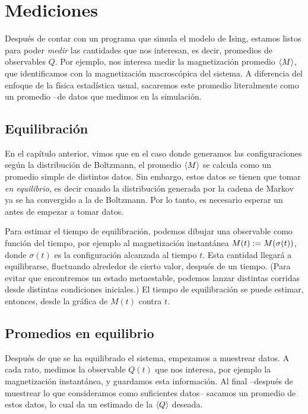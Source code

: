 \chapter{Mediciones}

Después de contar con un programa que simula el modelo de Ising, estamos listos para poder \emph{medir} las cantidades que nos interesan, es decir, promedios de observables $Q$.  Por ejemplo, nos interesa medir la magnetización promedio $\left \langle M \right \rangle$, que identificamos con la magnetización macroscópica del sistema.
A diferencia del enfoque de la física estadística usual, sacaremos este promedio literalmente como un promedio --de datos que medimos en la simulación.

\section{Equilibración}

En el capítulo anterior, vimos que en el caso donde generamos las configuraciones según la distribución de Boltzmann, el promedio $\left \langle M \right \rangle$ se calcula como un promedio simple de distintos datos. Sin embargo, estos datos se tienen que tomar \emph{en equilibrio}, es decir cuando la distribución generada por la cadena de Markov ya se ha convergido a la de Boltzmann. Por lo tanto, es necesario esperar un  antes de empezar a tomar datos.

Para estimar el tiempo de equilibración, podemos dibujar una observable como función del tiempo, por ejemplo al magnetización instantánea $M(t) := M(\sigma(t))$, donde $\sigma(t)$ es la configuración alcanzada al tiempo $t$. Esta cantidad llegará a equilibrarse, fluctuando alrededor de cierto valor, después de un tiempo.
(Para evitar que encontremos un estado metaestable, podemos lanzar distintas corridas desde distintas condiciones iniciales.)  El tiempo de equilibración se puede estimar, entonces, desde la gráfica de $M(t)$ contra $t$.

\section{Promedios en equilibrio}

Después de que se ha equilibrado el sistema, empezamos a muestrear datos.  A cada rato, medimos la observable $Q(t)$ que nos interesa, por ejemplo la magnetización instantánea, y guardamos esta información. Al final --después de muestrear lo que consideramos como suficientes datos-- sacamos un promedio de estos datos, lo cual da un estimado de la $\left \langle Q \right \rangle$ deseada.

